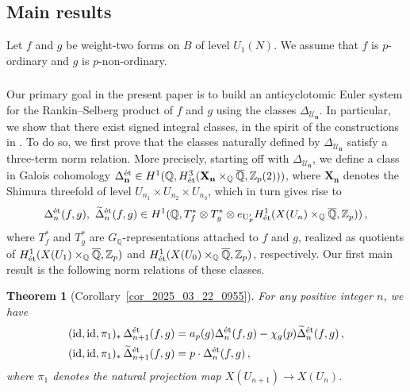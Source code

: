 \documentclass{amsart}
\numberwithin{equation}{section}
\newtheorem{lthm}{Theorem}
\newcommand{\QQ}{\mathbb{Q}}
\newcommand{\ZZ}{\mathbb{Z}}
\newcommand{\etale}{\textup{\'et}}
\newcommand{\Q}{\QQ}
\begin{document}
\subsection{Main results}
Let $f$ and $g$ be weight-two forms on $B$ of level $U_1(N)$. We assume that $f$ is $p$-ordinary and $g$ is $p$-non-ordinary. 
\subsubsection{} 
\label{subsubsec_2025_11_02_0946}
Our primary goal in the present paper is to build an anticyclotomic Euler system for the Rankin--Selberg product of $f$ and $g$ using the classes $\Delta_{\mathcal{U}_{\mathbf{n}} }$. In particular, we show that there exist signed integral classes, in the spirit of the constructions in \cite{BFSuper,BBL1, BL-MSMF,BBL2,sprung16,CCSS}. To do so, we first prove that the classes naturally defined by $\Delta_{\mathcal{U}_{\mathbf{n}} }$ satisfy a three-term norm relation. More precisely, starting off with $\Delta_{\mathcal{U}_{\mathbf{n}} }$,  we define a class in Galois cohomology 
$ \Delta_{\mathbf{n}}^{\etale} \in H^1(\Q,  H^3_{\etale} (\mathbf{X}_{\mathbf{n}}\times_{\QQ} \overline{\QQ}, \ZZ_p(2)))$, where $\mathbf{X}_{\mathbf{n}}$ denotes the Shimura threefold of level $U_{n_1} \times U_{n_2} \times U_{n_3}$, which in turn gives rise to
\[
\Delta_{n}^{\etale}(f,g),\ \widetilde{\Delta}_{n}^{\etale}(f,g)\in  H^1(\QQ, T_f^*\otimes T_g^* \otimes e_{\mathrm{U}_{p}'} H^1_{\etale} (X(U_{n})\times_{\QQ}
\overline{\QQ}, \ZZ_p))\,,
\]
where $T_f^*$ and $T_g^*$ are $G_\QQ$-representations attached to $f$ and $g$, realized as quotients of $H^1_{\etale} (X(U_{1})\times_{\QQ}
\overline{\QQ}, \ZZ_p)$ and $H^1_{\etale} (X(U_{0})\times_{\QQ}
\overline{\QQ}, \ZZ_p)$, respectively.
Our first main result is the following norm relations of these classes.


\begin{lthm}[Corollary~\ref{cor_2025_03_22_0955}]\label{thmA}
        For any positive integer $n$, we have
    \begin{align*}
        ({\rm id}, {\rm id},\pi_1)_*\,\Delta_{n+1}^{\etale}(f, g)&=a_p(g) \Delta_{n}^{\etale}(f,g)-\chi_g(p)\widetilde{\Delta}_{n}^{\etale}(f,g)\,,\\
        ({\rm id}, {\rm id},\pi_1)_*\,\widetilde\Delta_{n+1}^{\etale}(f, g)&=p\cdot \Delta_{n} ^{\etale}(f,g)\,,
    \end{align*}
       where $\pi_1$ denotes the natural projection map $X(U_{n+1})\to X(U_n)$.
\end{lthm}
\end{document}
